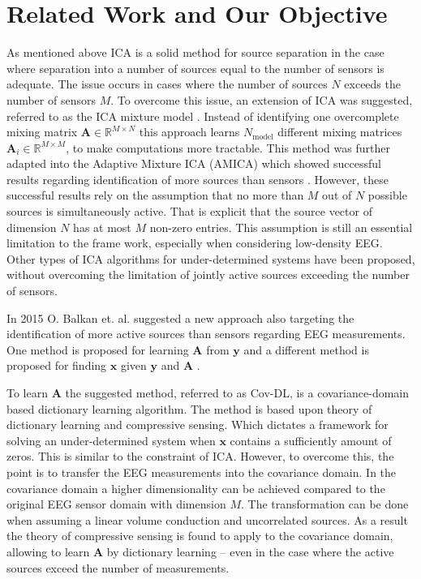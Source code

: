 \section{Related Work and Our Objective}\label{sec:relatedwork}
As mentioned above ICA is a solid method for source separation in the case where separation into a number of sources equal to the number of sensors is adequate. The issue occurs in cases where the number of sources $N$ exceeds the number of sensors $M$. 
To overcome this issue, an extension of ICA was suggested, referred to as the ICA mixture model \cite{Balkan2015}.
Instead of identifying one overcomplete mixing matrix $\mathbf{A} \in \mathbb{R}^{M \times N}$ this approach learns $N_{\text{model}}$ different mixing matrices $\mathbf{A}_i \in \mathbb{R}^{M\times M}$, to make computations more tractable. 
This method was further adapted into the Adaptive Mixture ICA (AMICA) which showed successful results regarding identification of more sources than sensors \cite{Palmer2008}. 
However, these successful results rely on the assumption that no more than $M$ out of $N$ possible sources is simultaneously active. That is explicit that the source vector of dimension $N$ has at most $M$ non-zero entries.
This assumption is still an essential limitation to the frame work, especially when considering low-density EEG. 
Other types of ICA algorithms for under-determined systems have been proposed, without overcoming the limitation of jointly active sources exceeding the number of sensors.

In 2015 O. Balkan et. al. suggested a new approach also targeting the identification of more active sources than sensors regarding EEG measurements. One method is proposed for learning $\textbf{A}$ from $\textbf{y}$ \cite{Balkan2015} and a different method is proposed for finding $\textbf{x}$ given $\textbf{y}$ and $\textbf{A}$ \cite{Balkan2014}.

To learn $\textbf{A}$ the suggested method, referred to as Cov-DL, is a covariance-domain based dictionary learning algorithm. 
The method is based upon theory of dictionary learning and compressive sensing. Which dictates a framework for solving an under-determined system when $\textbf{x}$ contains a sufficiently amount of zeros. 
This is similar to the constraint of ICA. However, to overcome this, the point is to transfer the EEG measurements into the covariance domain. In the covariance domain a higher dimensionality can be achieved compared to the original EEG sensor domain with dimension $M$.
The transformation can be done when assuming a linear volume conduction and uncorrelated sources.
As a result the theory of compressive sensing is found to apply to the covariance domain, allowing to learn $\textbf{A}$ by dictionary learning -- even in the case where the active sources exceed the number of measurements.

